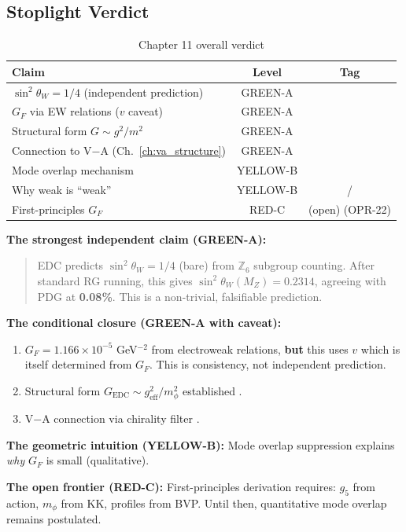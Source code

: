 \subsection{Stoplight Verdict}
\label{sec:ch11_verdict}

\begin{table}[ht]
\centering
\caption{Chapter 11 overall verdict}
\label{tab:ch11_verdict}
\begin{tabular}{lcc}
\toprule
\textbf{Claim} & \textbf{Level} & \textbf{Tag} \\
\midrule
$\sin^2\theta_W = 1/4$ (independent prediction) & GREEN-A & \tagDer{} \\
$G_F$ via EW relations ($v$ caveat) & GREEN-A & \tagDc{} \\
Structural form $G \sim g^2/m^2$ & GREEN-A & \tagDc{} \\
Connection to V$-$A (Ch.~\ref{ch:va_structure}) & GREEN-A & \tagDc{} \\
\midrule
Mode overlap mechanism & YELLOW-B & \tagP{} \\
Why weak is ``weak'' & YELLOW-B & \tagP{}/\tagI{} \\
\midrule
First-principles $G_F$ & RED-C & (open) (OPR-22) \\
\bottomrule
\end{tabular}
\end{table}

\begin{tcolorbox}[colback=green!5, colframe=green!50!black,
    title=\textbf{Chapter 11 Summary}]
\textbf{The strongest independent claim (GREEN-A):}
\begin{quote}
EDC predicts $\sin^2\theta_W = 1/4$ (bare) from $\mathbb{Z}_6$ subgroup counting.
After standard RG running, this gives $\sin^2\theta_W(M_Z) = 0.2314$, agreeing
with PDG at \textbf{0.08\%}. This is a non-trivial, falsifiable prediction.
\end{quote}

\textbf{The conditional closure (GREEN-A with caveat):}
\begin{enumerate}[nosep]
    \item $G_F = 1.166 \times 10^{-5}$ GeV$^{-2}$ from electroweak relations,
          \textbf{but} this uses $v$ which is itself determined from $G_F$.
          This is consistency, not independent prediction.
    \item Structural form $G_{\text{EDC}} \sim g_{\text{eff}}^2/m_\phi^2$
          established \tagDc{}.
    \item V$-$A connection via chirality filter \tagDc{}.
\end{enumerate}

\textbf{The geometric intuition (YELLOW-B):}
Mode overlap suppression explains \emph{why} $G_F$ is small (qualitative).

\textbf{The open frontier (RED-C):}
First-principles derivation requires: $g_5$ from action, $m_\phi$ from KK,
profiles from BVP. Until then, quantitative mode overlap remains postulated.
\end{tcolorbox}

